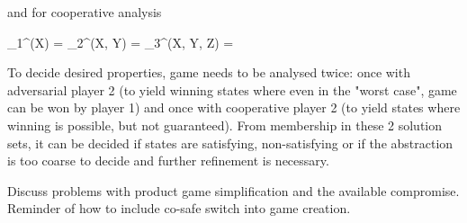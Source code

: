 and for cooperative analysis

\startformula
    \startalign[n=2,align={right,left}]
        \NC \Pre_1^{\Coop}(X) =
        \NC {} \cup {}
        \NR
        \NC \Pre_2^{\Coop}(X, Y) =
        \NC {} \cup {}
        \NR
        \NC \Pre_3^{\Coop}(X, Y, Z) =
        \NC {} \cup {}
        \NR
    \stopalign
\stopformula

To decide desired properties, game needs to be analysed twice:
once with adversarial player 2 (to yield winning states where even in the "worst case", game can be won by player 1) and once with cooperative player 2 (to yield states where winning is possible, but not guaranteed).
From membership in these 2 solution sets, it can be decided if states are satisfying, non-satisfying or if the abstraction is too coarse to decide and further refinement is necessary.

Discuss problems with product game simplification and the available compromise.
Reminder of how to include co-safe switch into game creation.

